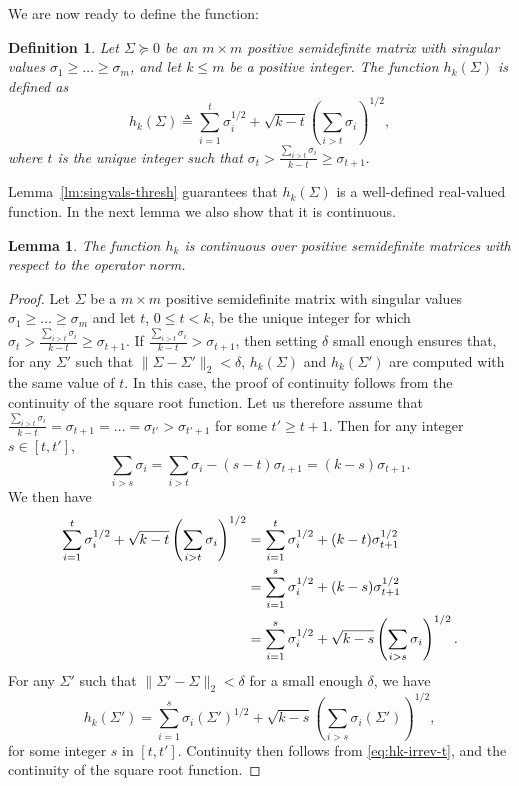 \documentclass{article}
\newtheorem{definition}{Definition}[section]
\newtheorem{lemma}{Lemma}[theorem]
\begin{document}
We are now ready to define the function:
\begin{definition}
  Let $\Sigma \succeq 0$ be an $m\times m$ positive semidefinite
  matrix with singular values $\sigma_1\geq \ldots \geq \sigma_m$, and
  let $k \leq m$ be a positive integer. The function $h_k(\Sigma)$ is
  defined as
  \[
  h_k(\Sigma) \triangleq \sum_{i = 1}^t{\sigma_i^{1/2}} +  \sqrt{k-t}\left(\sum_{i > t}{\sigma_i}\right)^{1/2},
  \]
  where $t$ is the unique integer such that 
  $
  \sigma_t > \frac{\sum_{i > t}{\sigma_i}}{k - t} \geq \sigma_{t+1}.
  $
\end{definition}
Lemma~\ref{lm:singvals-thresh} guarantees that $h_k(\Sigma)$ is a
well-defined real-valued function. In the next lemma we also show that
it is continuous.

\begin{lemma}\label{lm:hk-contin}
  The function $h_k$ is continuous over positive semidefinite
  matrices with respect to the operator norm.  
\end{lemma}
\begin{proof}
  Let $\Sigma$ be a $m\times m$ positive semidefinite matrix with singular
  values $\sigma_1 \geq \ldots \geq \sigma_m$ and let $t$, $0\leq t < k$, be the
  unique integer for which $\sigma_t > \frac{\sum_{i > t}{\sigma_i}}{k
    - t} \geq \sigma_{t+1}$. If $\frac{\sum_{i > t}{\sigma_i}}{k - t}
  > \sigma_{t+1}$, then setting $\delta$ small enough ensures that, for
  any $\Sigma'$ such that $\|\Sigma - \Sigma'\|_2 < \delta$, $h_k(\Sigma)$ and $h_k(\Sigma')$ are
  computed with the same value of $t$. In this case, the proof of
  continuity follows from the continuity of the square root
  function. Let us therefore assume that $\frac{\sum_{i > t}{\sigma_i}}{k - t}
  = \sigma_{t+1} = \ldots = \sigma_{t'}>\sigma_{t'+1}$ for some $t'
  \geq t+1$. Then  for any integer $s \in [t, t']$,
  \[
  \sum_{i > s}{\sigma_i} = \sum_{i>t}{\sigma_i} - (s-t)\sigma_{t+1}
  = (k-s)\sigma_{t+1}.
  \]
  We then have
  \begin{align}\label{eq:hk-irrev-t}
    \sum_{i = 1}^t{\sigma_i^{1/2}} +  \sqrt{k-t}\left(\sum_{i >
        t}{\sigma_i}\right)^{1/2} &= 
    \sum_{i = 1}^t{\sigma_i^{1/2}} +  (k-t)\sigma^{1/2}_{t+1}\notag\\
    &= \sum_{i = 1}^s{\sigma_i^{1/2}} +
    (k-s)\sigma^{1/2}_{t+1}\notag\\
    &= \sum_{i = 1}^s{\sigma_i^{1/2}} +  \sqrt{k-s}\left(\sum_{i > s}{\sigma_i}\right)^{1/2}.
  \end{align}
  For any $\Sigma'$ such that $\|\Sigma' - \Sigma\|_2 < \delta$ for a small enough
  $\delta$, we have
  \begin{equation*}
  h_k(\Sigma') =  \sum_{i = 1}^s{\sigma_i(\Sigma')^{1/2}} +  \sqrt{k-s}\left(\sum_{i >
     s}{\sigma_i(\Sigma')}\right)^{1/2},
  \end{equation*}
for some integer $s$  in $[t,t']$. Continuity then follows from
  \eqref{eq:hk-irrev-t}, and the
  continuity of the square root function. 
\end{proof}
\end{document}
